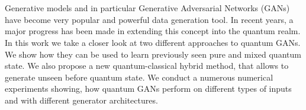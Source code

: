 \chapter{\abstractname}

Generative models and in particular Generative Adversarial Networks (GANs) have
become very popular and powerful data generation tool. In recent years, a major
progress has been made in extending this concept into the quantum realm. In this
work we take a closer look at two different approaches to quantum GANs. We show how they can
be used to learn previously seen pure and mixed quantum state. We also propose a
new quantum-classical hybrid method, that allows to generate unseen before
quantum state. We conduct a numerous numerical experiments showing, how quantum
GANs perform on different types of inputs and with different generator architectures.






%
%
%
%
%
